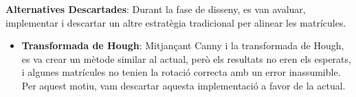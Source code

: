 \textbf{Alternatives Descartades}: Durant la fase de disseny, es van avaluar, implementar i descartar un altre estratègia tradicional per alinear les matrícules. 

\begin{itemize}
    \item \textbf{Transformada de Hough}:
    Mitjançant Canny i la transformada de Hough, es va crear un mètode similar al actual, però els resultats no eren els esperats, i algunes matrícules no tenien la rotació correcta amb un error inassumible. Per aquest motiu, vam descartar aquesta implementació a favor de la actual.
   
\end{itemize}
